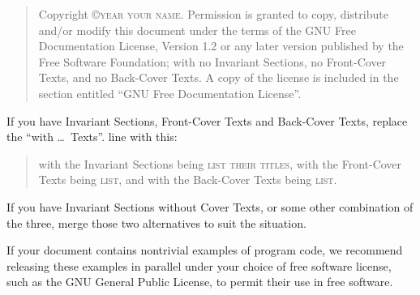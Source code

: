 \bigskip
\begin{quote}
    Copyright \copyright \textsc{year your name}.
    Permission is granted to copy, distribute and/or modify this document
    under the terms of the GNU Free Documentation License, Version 1.2
    or any later version published by the Free Software Foundation;
    with no Invariant Sections, no Front-Cover Texts, and no Back-Cover Texts.
    A copy of the license is included in the section entitled ``GNU
    Free Documentation License''.
\end{quote}
\bigskip

If you have Invariant Sections, Front-Cover Texts and Back-Cover Texts, replace
the ``with \dots\ Texts''. line with this:

\bigskip
\begin{quote}
    with the Invariant Sections being \textsc{list their titles}, with the
    Front-Cover Texts being \textsc{list}, and with the Back-Cover
    Texts being \textsc{list}.
\end{quote}
\bigskip

If you have Invariant Sections without Cover Texts, or some other combination
of the three, merge those two alternatives to suit the situation.

If your document contains nontrivial examples of program code, we recommend
releasing these examples in parallel under your choice of free software
license, such as the GNU General Public License, to permit their use in free
software.


